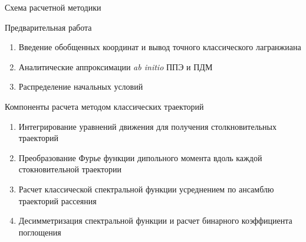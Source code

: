 \documentclass[10pt,usenames,pdf,hyperref={unicode},dvipsnames]{beamer}
\begin{document}
\begin{frame}{Схема расчетной методики}
    \vspace*{-0.5cm}
    \begin{block}{Предварительная работа}
        \begin{enumerate}
            \item Введение обобщенных координат и вывод точного классического лагранжиана
            \item Аналитические аппроксимации \textit{ab initio} ППЭ и ПДМ
            \item Распределение начальных условий
        \end{enumerate}
    \end{block}
    \vspace*{-0.3cm}
    \begin{block}{Компоненты расчета методом классических траекторий}
        \begin{enumerate}
        \item Интегрирование уравнений движения для получения столкновительных траекторий
        \item Преобразование Фурье функции дипольного момента вдоль каждой стокновительной траектории
        \item Расчет классической спектральной функции усреднением по ансамблю траекторий рассеяния 
        \item Десимметризация спектральной функции и расчет бинарного коэффициента поглощения
        \end{enumerate}
    \end{block}
\end{frame}
\end{document}
